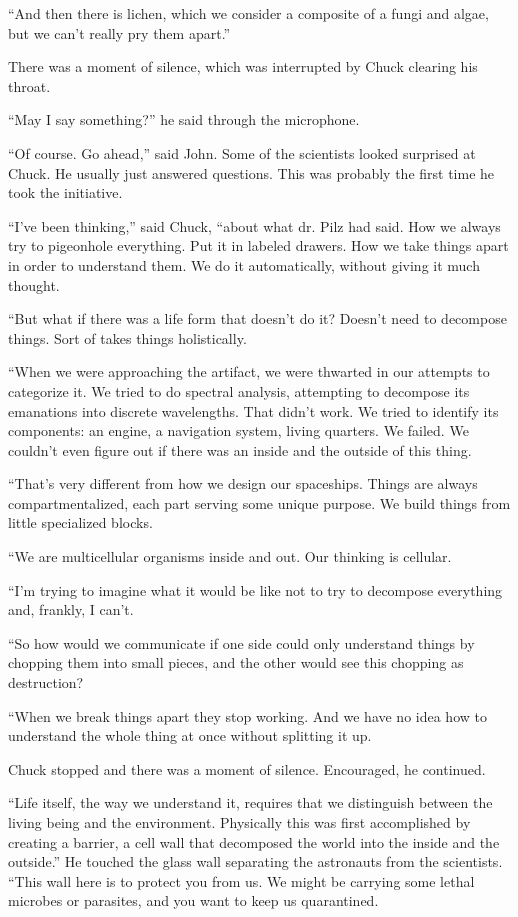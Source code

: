 \documentclass{memoir}
\begin{document}
``And then there is lichen, which we consider a composite of a fungi and algae, but we can't really pry them apart.''

There was a moment of silence, which was interrupted by Chuck clearing his throat.

``May I say something?'' he said through the microphone.

``Of course. Go ahead,'' said John. Some of the scientists looked surprised at Chuck. He usually just answered questions. This was probably the first time he took the initiative.

``I've been thinking,'' said Chuck, ``about what dr. Pilz had said. How we always try to pigeonhole everything. Put it in labeled drawers. How we take things apart in order to understand them. We do it automatically, without giving it much thought.

``But what if there was a life form that doesn't do it? Doesn't need to decompose things. Sort of takes things holistically.

``When we were approaching the artifact, we were thwarted in our attempts to categorize it. We tried to do spectral analysis, attempting to decompose its emanations into discrete wavelengths. That didn't work. We tried to identify its components: an engine, a navigation system, living quarters. We failed. We couldn't even figure out if there was an inside and the outside of this thing.

``That's very different from how we design our spaceships. Things are always compartmentalized, each part serving some unique purpose. We build things from little specialized blocks. 

``We are multicellular organisms inside and out. Our thinking is cellular. 

``I'm trying to imagine what it would be like not to try to decompose everything and, frankly, I can't. 

``So how would we communicate if one side could only understand things by chopping them into small pieces, and the other would see this chopping as destruction?

``When we break things apart they stop working. And we have no idea how to understand the whole thing at once without splitting it up.

Chuck stopped and there was a moment of silence. Encouraged, he continued.

``Life itself, the way we understand it, requires that we distinguish between the living being and the environment. Physically this was first accomplished by creating a barrier, a cell wall that decomposed the world into the inside and the outside.'' He touched the glass wall separating the astronauts from the scientists. ``This wall here is to protect you from us. We might be carrying some lethal microbes or parasites, and you want to keep us quarantined.
\end{document}
